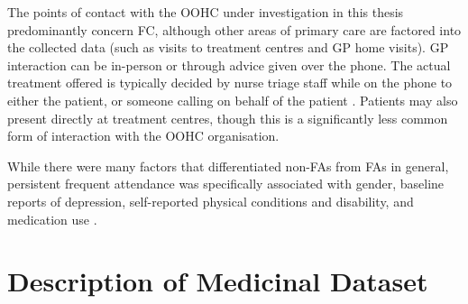 The points of contact with the  OOHC under investigation in this thesis predominantly concern FC, although other areas of primary care are factored into  the collected data (such as visits to treatment centres and GP home visits). GP interaction can be  in-person or through advice given over the phone.  The actual treatment offered is typically decided by nurse triage staff while on the phone to either the patient, or someone calling on behalf of the patient \cite{graversen2019quality}. Patients may also present directly at treatment centres, though this is a significantly less common form of interaction with the OOHC organisation. 


While there were many factors that differentiated non-FAs from FAs in general, persistent frequent attendance was specifically associated with gender, baseline reports of depression, self-reported physical conditions and disability, and medication use \cite{pymont2015longitudinal}.







 
\section{Description of Medicinal Dataset}
\label{chpt:medicial-dataset}

